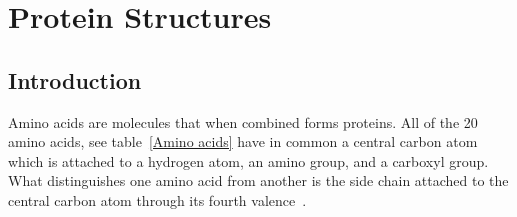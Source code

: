 \documentclass{report}
\begin{document}
\section{Protein Structures}

\subsection{Introduction}

Amino acids are molecules that when combined forms proteins. All of the 20 amino acids, see table~\ref{Amino acids} have in common a central carbon atom which is attached to a hydrogen atom, an amino group, and a carboxyl group. What distinguishes one amino acid from another is the side chain attached to the central carbon atom through its fourth valence~\cite{branden_introduction_1998}.
\end{document}
